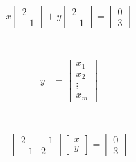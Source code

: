 \documentclass[11pt]{article}
\begin{document}
    \section{}\label{sec:6}
    \begin{align}
        x
        \begin{bmatrix}
            2\\-1
        \end{bmatrix}
        +y
        \begin{bmatrix}
            2\\-1
        \end{bmatrix}
        =
        \begin{bmatrix}
            0\\3
        \end{bmatrix}
    \end{align}


    \section{}\label{sec:7}
    \begin{align}
        y &= \begin{bmatrix}
                 x_{1}  \\
                 x_{2}  \\
                 \vdots \\
                 x_{m}
        \end{bmatrix}
    \end{align}


    \pagebreak


    \section{}\label{sec:8}
    \begin{align}
        \begin{bmatrix}
            2& -1\\-1& 2
        \end{bmatrix}
        \begin{bmatrix}
            x\\y
        \end{bmatrix}
        =
        \begin{bmatrix}
            0\\3
        \end{bmatrix}
    \end{align}
\end{document}
